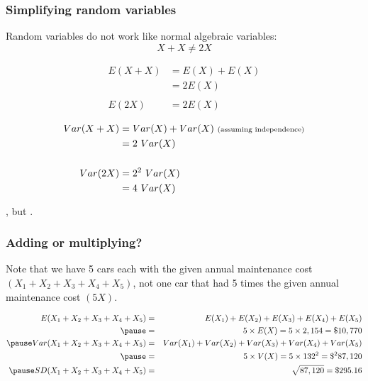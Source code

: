 \documentclass[slidestop,compress,mathserif]{beamer}
\begin{document}

\begin{frame}
\frametitle{Simplifying random variables}

Random variables do not work like normal algebraic variables:
\[ X + X \ne 2X \]

\pause

{\small
{}
{
\begin{align*}
E(X + X) &= E(X) + E(X) \\
&= 2 E(X) \\
&~  \\
E(2X) &= 2 E(X) \\
&~ 
\end{align*}
}
{
\begin{align*}
Var(X + X) &= Var(X) + Var(X)~{\scriptsize \text{(assuming independence)}} \\
&= 2~Var(X) \\
&~  \\
Var(2X) &= 2^2~Var(X) \\
&= 4~Var(X)
\end{align*}
}
}


\pause

\vspace{3mm}

, but .

\end{frame}


\begin{frame}
\frametitle{Adding or multiplying?}


\pause

Note that we have 5 cars each with the given annual maintenance cost $(X_1 + X_2 + X_3 + X_4 + X_5)$, not one car that had 5 times the given annual maintenance cost $(5X)$.

\pause

{\small
\begin{eqnarray*} 
E(X_1 + X_2 + X_3 + X_4 + X_5) &=& E(X_1) + E(X_2) + E(X_3) + E(X_4) + E(X_5) \\
\pause
&=& 5 \times E(X) = 5 \times 2,154 = \$ 10,770 \\
\pause
Var(X_1 + X_2 + X_3 + X_4 + X_5) &=& Var(X_1) + Var(X_2) + Var(X_3) + Var(X_4) + Var(X_5) \\
\pause
&=& 5 \times V(X) = 5 \times 132^2 = \$^2 87,120 \\
\pause
SD(X_1 + X_2 + X_3 + X_4 + X_5) &=& \sqrt{87,120} =  \$ 295.16
\end{eqnarray*}
}

\end{frame}
\end{document}
